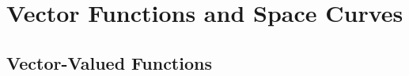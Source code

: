 \documentclass[../Calculus_\Roman{3}]{subfiles}
\begin{document}
	\section{Vector Functions and Space Curves}
		\subsection*{Vector-Valued Functions}
\end{document}
